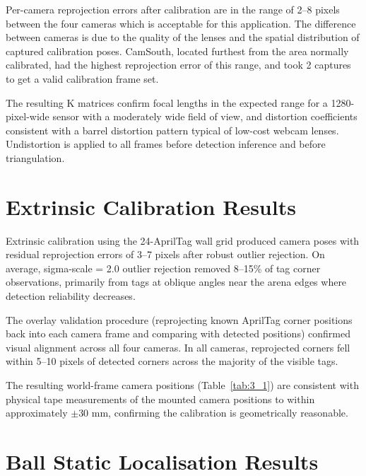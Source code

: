 Per-camera reprojection errors after calibration are in the range of 2--8 pixels between the four cameras which is acceptable for this application. The difference between cameras is due to the quality of the lenses and the spatial distribution of captured calibration poses. CamSouth, located furthest from the area normally calibrated, had the highest reprojection error of this range, and took 2 captures to get a valid calibration frame set.

The resulting K matrices confirm focal lengths in the expected range for a 1280-pixel-wide sensor with a moderately wide field of view, and distortion coefficients consistent with a barrel distortion pattern typical of low-cost webcam lenses. Undistortion is applied to all frames before detection inference and before triangulation.

\section{Extrinsic Calibration Results}

Extrinsic calibration using the 24-AprilTag wall grid produced camera poses with residual reprojection errors of 3--7 pixels after robust outlier rejection. On average, sigma-scale = 2.0 outlier rejection removed 8--15\% of tag corner observations, primarily from tags at oblique angles near the arena edges where detection reliability decreases.

The overlay validation procedure (reprojecting known AprilTag corner positions back into each camera frame and comparing with detected positions) confirmed visual alignment across all four cameras. In all cameras, reprojected corners fell within 5--10 pixels of detected corners across the majority of the visible tags.

The resulting world-frame camera positions (Table~\ref{tab:3_1}) are consistent with physical tape measurements of the mounted camera positions to within approximately \(\pm\)30 mm, confirming the calibration is geometrically reasonable.

\section{Ball Static Localisation Results}

